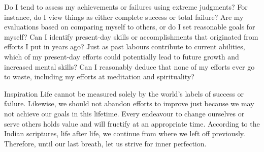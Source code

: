 



\newpage
\begin{mananam}{}
\mananamtext Do I tend to assess my achievements or failures using extreme judgments? For instance, do I view things as either complete success or total failure? Are my evaluations based on comparing myself to others, or do I set reasonable goals for myself?
Can I identify present-day skills or accomplishments that originated from efforts I put in years ago? Just as past labours contribute to current abilities, which of my present-day efforts could potentially lead to future growth and increased mental skills? Can I reasonably deduce that none of my efforts ever go to waste, including my efforts at meditation and spirituality?
\end{mananam}
\WritingHand{}
\begin{inspiration}{\mananamfont Inspiration}
\mananamtext Life cannot be measured solely by the world’s labels of success or failure. Likewise, we should not abandon efforts to improve just because we may not achieve our goals in this lifetime. Every endeavour to change ourselves or serve others holds value and will fructify at an appropriate time. According to the Indian scriptures, life after life, we continue from where we left off previously. Therefore, until our last breath, let us strive for inner perfection.
\end{inspiration}
\newpage


